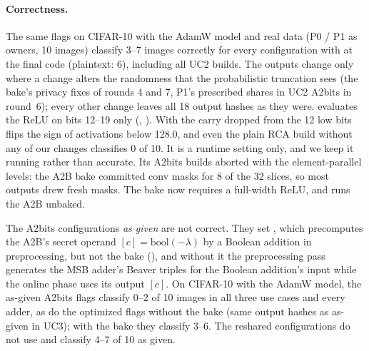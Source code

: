 \paragraph{Correctness.} The same flags on CIFAR-10 with the AdamW model and real data (P0 / P1 as owners, 10
images) classify 3--7 images correctly for every configuration with  at the final code (plaintext:
6), including all UC2 builds. The outputs change only where a change alters the randomness that the probabilistic
truncation sees (the bake's privacy fixes of rounds 4 and 7, P1's prescribed shares in UC2 A2bits in round~6); every
other change leaves all 18 output hashes as they were. 
evaluates the ReLU on bits 12--19 only (, ). With  the
carry dropped from the 12 low bits flips the sign of activations below 128.0, and even the plain RCA build without any of
our changes classifies 0 of 10. It is a runtime setting only, and we keep it running rather than accurate. Its A2bits
builds aborted with the element-parallel levels: the A2B bake committed conv masks for 8 of the 32 slices, so most
outputs drew fresh masks. The bake now requires a full-width ReLU, and  runs the A2B unbaked.

The A2bits configurations \emph{as given} are not correct. They set , which precomputes the
A2B's secret operand $[c] = \mathrm{bool}(-\lambda)$ by a Boolean addition in preprocessing, but not the bake
(), and without it the preprocessing pass generates the MSB adder's Beaver triples for the
Boolean addition's input while the online phase uses its output $[c]$. On CIFAR-10 with the AdamW model, the as-given
A2bits flags classify 0--2 of 10 images in all three use cases and every adder, as do the optimized flags without
the bake (same output hashes as as-given in UC3); with the bake they classify 3--6. The reshared configurations do not
use  and classify 4--7 of 10 as given.

